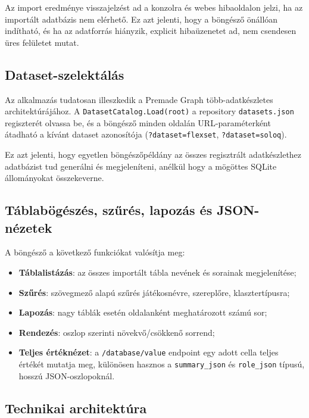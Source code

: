 ﻿\documentclass[a4paper,12pt]{report}
\begin{document}
Az import eredménye visszajelzést ad a konzolra és webes hibaoldalon jelzi, ha az importált adatbázis nem elérhető. Ez azt jelenti, hogy a böngésző önállóan indítható, és ha az adatforrás hiányzik, explicit hibaüzenetet ad, nem csendesen üres felületet mutat.

\subsection{Dataset-szelektálás}

Az alkalmazás tudatosan illeszkedik a Premade Graph több-adatkészletes architektúrájához. A \texttt{DatasetCatalog.Load(root)} a repository \texttt{datasets.json} regiszterét olvassa be, és a böngésző minden oldalán URL-paraméterként átadható a kívánt dataset azonosítója (\texttt{?dataset=flexset}, \texttt{?dataset=soloq}).

Ez azt jelenti, hogy egyetlen böngészőpéldány az összes regisztrált adatkészlethez adatbázist tud generálni és megjeleníteni, anélkül hogy a mögöttes SQLite állományokat összekeverne.

\subsection{Táblabögészés, szűrés, lapozás és JSON-nézetek}

A böngésző a következő funkciókat valósítja meg:

\begin{itemize}
    \item \textbf{Táblalistázás}: az összes importált tábla nevének és sorainak megjelenítése;
    \item \textbf{Szűrés}: szövegmező alapú szűrés játékosnévre, szereplőre, klasztertípusra;
    \item \textbf{Lapozás}: nagy táblák esetén oldalanként meghatározott számú sor;
    \item \textbf{Rendezés}: oszlop szerinti növekvő/csökkenő sorrend;
    \item \textbf{Teljes értéknézet}: a \texttt{/database/value} endpoint egy adott cella teljes értékét mutatja meg, különösen hasznos a \texttt{summary\_json} és \texttt{role\_json} típusú, hosszú JSON-oszlopoknál.
\end{itemize}

\subsection{Technikai architektúra}
\end{document}
